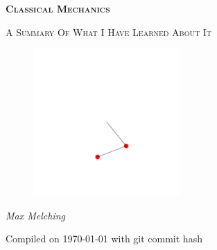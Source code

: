 \documentclass[class_mech_main.tex]{subfiles}
\begin{document}
\pagestyle{plain.scrheadings}


\begin{center}
\thispagestyle{empty}


\rule{0pt}{0pt}

\vspace{5\baselineskip}



\settowidth{\unitlength}{\Huge\bfseries Summary}


{%
	\Huge%
	\bfseries%
	\scshape%
	Classical Mechanics%
}


\vspace{\baselineskip}


{%
	\Large%
	\scshape%
	A Summary Of What I Have Learned About It%
}



\begin{figure}[h]
	\centering

	\vspace*{-\baselineskip}

	\includegraphics[width=0.5\textwidth]{pictures/title_pic_v5.pdf}%

	\vspace*{-\baselineskip}
\end{figure}


\vspace{2\baselineskip}

{%
	\Large%
	\slshape%
	Max Melching%
}


\vspace{\baselineskip}


{Compiled on \today{} with git commit hash 
\code{%
	\HEAD{}%
}\hspace{-0.5em}}


\end{center}
\end{document}
